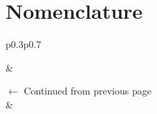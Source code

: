\chapter*{Nomenclature}

\label{chapter:nomenclature}

\begin{longtable}{p{}p{}}
	
	 &   \\ \hline
	\endfirsthead
	
	{$\leftarrow$ Continued from previous page} \\
	 &
	 \\ \hline 
	\endhead
	
	 \\
	\endfoot
	
	\endlastfoot
	
	
	

\end{longtable}
